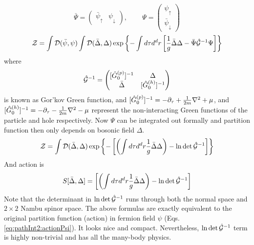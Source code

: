 \begin{equation}
\bar\Psi=\begin{pmatrix}\bar{\psi}_{\uparrow}&\psi_{\downarrow}\end{pmatrix}\text{,  }\qquad
\Psi=\begin{pmatrix}{\psi}_{\uparrow}\\\bar\psi_{\downarrow}\end{pmatrix}
\end{equation}
\begin{equation}
\mathcal{Z}=\int{\ensuremath{\mathcal{D}}(\bar\psi,\psi)}\int{\ensuremath{\mathcal{D}}(\bar\Delta,\Delta)}\exp
	\left\{-\int{d\tau{d^{d}r}}\left[\frac{1}{g}{\bar\Delta}{\Delta}-\bar\Psi \hat{\mathcal{G}}^{-1}\Psi\right]\right\}
\end{equation}
where 
\begin{equation}\label{eq:pathInt:nG}
\hat{\mathcal{G}}^{-1}=\begin{pmatrix}
[\hat{G}_{0}^{(p)}]^{-1}&\Delta\\\bar\Delta&[\hat{G}_{0}^{(h)}]^{-1}
\end{pmatrix}
\end{equation}
is known as Gor'kov Green function, and $[\hat{G}_{0}^{(p)}]^{-1}=-\partial_{\tau}+\frac{1}{2m}\nabla^{2}+\mu$, and $[\hat{G}_{0}^{(h)}]^{-1}=-\partial_{\tau}-\frac{1}{2m}\nabla^{2}-\mu$ represent the non-interacting Green functions of the particle and hole respectively. Now $\Psi$ can be integrated out formally and partition function then only depends on bosonic field $\Delta$.  
\begin{equation}\label{eq:pathInt:DeltaPF}
\mathcal{Z}=\int{\ensuremath{\mathcal{D}}(\bar\Delta,\Delta)}\exp
	\left\{-\left[\left(\int{d\tau{d^{d}r}}\frac{1}{g}{\bar\Delta\Delta}\right)-\ln\det\hat{\mathcal{G}}^{-1}\right]\right\}
\end{equation}
And action is
\begin{equation}\label{eq:pathInt:DeltaAction}
S[\bar\Delta,\Delta]=
	{\left[\left(\int{d\tau{d^{d}r}}\frac{1}{g}{\bar\Delta\Delta}\right)-\ln\det\hat{\mathcal{G}}^{-1}\right]}
\end{equation}
Note that the determinant in $\ln\det\hat{\mathcal{G}}^{-1}$ runs through both the normal space and $2\times2$ Nambu spinor space.  The above formulas are exactly equivalent to the original partition function (action) in fermion field $\psi$ (Eqs. \ref{eq:pathInt2:actionPsi}). It looks nice and compact. Nevertheless, $\ln\det\hat{\mathcal{G}}^{-1}$ term is highly non-trivial and has all the many-body physics.


